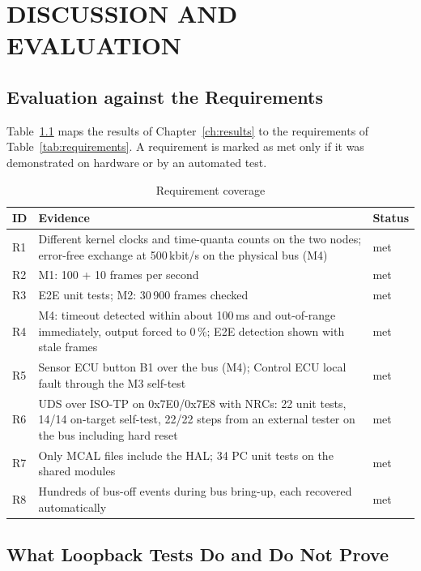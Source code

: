 \chapter{DISCUSSION AND EVALUATION}
\label{ch:discussion}

\section{Evaluation against the Requirements}

Table~\ref{tab:reqeval} maps the results of Chapter~\ref{ch:results} to the requirements of Table~\ref{tab:requirements}. A requirement is marked as met only if it was demonstrated on hardware or by an automated test.

\begin{table}[H]
\centering
\small
\caption{Requirement coverage}
\label{tab:reqeval}
\begin{tabularx}{\textwidth}{@{}lXl@{}}
\toprule
\textbf{ID} & \textbf{Evidence} & \textbf{Status} \\
\midrule
R1 & Different kernel clocks and time-quanta counts on the two nodes; error-free exchange at 500\,kbit/s on the physical bus (M4) & met \\
R2 & M1: 100 + 10 frames per second & met \\
R3 & E2E unit tests; M2: 30\,900 frames checked & met \\
R4 & M4: timeout detected within about 100\,ms and out-of-range immediately, output forced to 0\,\%; E2E detection shown with stale frames & met \\
R5 & Sensor ECU button B1 over the bus (M4); Control ECU local fault through the M3 self-test & met \\
R6 & UDS over ISO-TP on 0x7E0/0x7E8 with NRCs: 22 unit tests, 14/14 on-target self-test, 22/22 steps from an external tester on the bus including hard reset & met \\
R7 & Only MCAL files include the HAL; 34 PC unit tests on the shared modules & met \\
R8 & Hundreds of bus-off events during bus bring-up, each recovered automatically & met \\
\bottomrule
\end{tabularx}
\end{table}

\section{What Loopback Tests Do and Do Not Prove}

